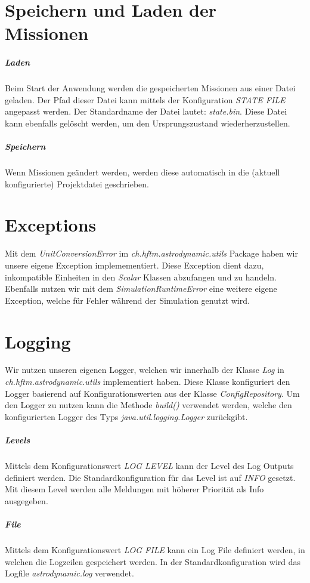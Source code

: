 \section{Speichern und Laden der Missionen}

\subparagraph{Laden}
Beim Start der Anwendung werden die gespeicherten Missionen aus einer Datei geladen.
Der Pfad dieser Datei kann mittels der Konfiguration \textit{STATE FILE} angepasst werden.
Der Standardname der Datei lautet: \textit{state.bin}.
Diese Datei kann ebenfalls gelöscht werden, um den Ursprungszustand wiederherzustellen.

\subparagraph{Speichern}
Wenn Missionen geändert werden, werden diese automatisch in die (aktuell konfigurierte) Projektdatei geschrieben.


\section{Exceptions}

Mit dem \textit{UnitConversionError} im \textit{ch.hftm.astrodynamic.utils} Package haben wir unsere eigene Exception implemementiert.
Diese Exception dient dazu, inkompatible Einheiten in den \textit{Scalar} Klassen abzufangen und zu handeln.
Ebenfalls nutzen wir mit dem \textit{SimulationRuntimeError} eine weitere eigene Exception, welche für Fehler während der Simulation genutzt wird.

\section{Logging}

Wir nutzen unseren eigenen Logger, welchen wir innerhalb der Klasse \textit{Log} in \textit{ch.hftm.astrodynamic.utils} implementiert haben.
Diese Klasse konfiguriert den Logger basierend auf Konfigurationswerten aus der Klasse \textit{ConfigRepository}.
Um den Logger zu nutzen kann die Methode \textit{build()} verwendet werden, welche den konfigurierten Logger des Typs \textit{java.util.logging.Logger} zurückgibt.

\subparagraph{Levels}

Mittels dem Konfigurationswert \textit{LOG LEVEL} kann der Level des Log Outputs definiert werden.
Die Standardkonfiguration für das Level ist auf \textit{INFO} gesetzt. Mit diesem Level werden alle Meldungen mit höherer Priorität als Info ausgegeben. 

\subparagraph{File}

Mittels dem Konfigurationswert \textit{LOG FILE} kann ein Log File definiert werden, in welchen die Logzeilen gespeichert werden.
In der Standardkonfiguration wird das Logfile \textit{astrodynamic.log} verwendet.

